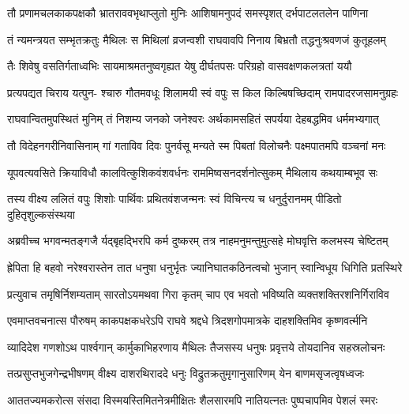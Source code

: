 \fourlineindentedshloka
{तौ प्रणामचलकाकपक्षकौ}
{भ्रातराववभृथाप्लुतो मुनिः}
{आशिषामनुपदं समस्पृशत्}
{दर्भपाटलतलेन पाणिना} %

\fourlineindentedshloka
{तं न्यमन्त्रयत सम्भृतक्रतुः}
{मैथिलः स मिथिलां व्रजन्वशी}
{राघवावपि निनाय बिभ्रतौ}
{तद्धनुःश्रवणजं कुतूहलम्} %

\fourlineindentedshloka
{तैः शिवेषु वसतिर्गताध्वभिः}
{सायमाश्रमतनुष्वगृह्यत}
{येषु दीर्घतपसः परिग्रहो}
{वासवक्षणकलत्रतां ययौ} %

\fourlineindentedshloka
{प्रत्यपद्यत चिराय यत्पुन-}
{श्चारु गौतमवधूः शिलामयी}
{स्वं वपुः स किल किल्बिषच्छिदाम्}
{रामपादरजसामनुग्रहः} %

\fourlineindentedshloka
{राघवान्वितमुपस्थितं मुनिम्}
{तं निशम्य जनको जनेश्वरः}
{अर्थकामसहितं सपर्यया}
{देहबद्धमिव धर्ममभ्यगात्} %

\fourlineindentedshloka
{तौ विदेहनगरीनिवासिनाम्}
{गां गताविव दिवः पुनर्वसू}
{मन्यते स्म पिबतां विलोचनैः}
{पक्ष्मपातमपि वञ्चनां मनः} %

\fourlineindentedshloka
{यूपवत्यवसिते क्रियाविधौ}
{कालवित्कुशिकवंशवर्धनः}
{राममिष्वसनदर्शनोत्सुकम्}
{मैथिलाय कथयाम्बभूव सः} %

\fourlineindentedshloka
{तस्य वीक्ष्य ललितं वपुः शिशोः}
{पार्थिवः प्रथितवंशजन्मनः}
{स्वं विचिन्त्य च धनुर्दुरानमम्}
{पीडितो दुहितृशुल्कसंस्थया} %

\fourlineindentedshloka
{अब्रवीच्च भगवन्मतङ्गजै}
{र्यद्बृहद्भिरपि कर्म दुष्करम्}
{तत्र नाहमनुमन्तुमुत्सहे}
{मोघवृत्ति कलभस्य चेष्टितम्} %

\fourlineindentedshloka
{ह्रेपिता हि बहवो नरेश्वरास्तेन}
{तात धनुषा धनुर्भृतः}
{ज्यानिघातकठिनत्वचो भुजान्}
{स्वान्विधूय धिगिति प्रतस्थिरे} %

\fourlineindentedshloka
{प्रत्युवाच तमृषिर्निशम्यताम्}
{सारतोऽयमथवा गिरा कृतम्}
{चाप एव भवतो भविष्यति}
{व्यक्तशक्तिरशनिर्गिराविव} %

\fourlineindentedshloka
{एवमाप्तवचनात्स पौरुषम्}
{काकपक्षकधरेऽपि राघवे}
{श्रद्दधे त्रिदशगोपमात्रके}
{दाहशक्तिमिव कृष्णवर्त्मनि} %

\fourlineindentedshloka
{व्यादिदेश गणशोऽथ पार्श्वगान्}
{कार्मुकाभिहरणाय मैथिलः}
{तैजसस्य धनुषः प्रवृत्तये}
{तोयदानिव सहस्रलोचनः} %

\fourlineindentedshloka
{तत्प्रसुप्तभुजगेन्द्रभीषणम्}
{वीक्ष्य दाशरथिराददे धनुः}
{विद्रुतक्रतुमृगानुसारिणम्}
{येन बाणमसृजत्वृषध्वजः} %

\fourlineindentedshloka
{आततज्यमकरोत्स संसदा}
{विस्मयस्तिमितनेत्रमीक्षितः}
{शैलसारमपि नातियत्नतः}
{पुष्पचापमिव पेशलं स्मरः} %

